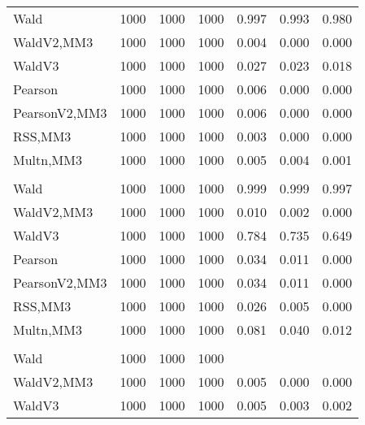 \documentclass[
]{article}
\begin{document}
\begin{table}[H]
{\begin{tabular}[t]{lrrrrrr}
\hspace{1em}Wald & 1000 & 1000 & 1000 & 0.997 & 0.993 & 0.980\\
\hspace{1em}WaldV2,MM3 & 1000 & 1000 & 1000 & 0.004 & 0.000 & 0.000\\
\hspace{1em}WaldV3 & 1000 & 1000 & 1000 & 0.027 & 0.023 & 0.018\\
\hspace{1em}Pearson & 1000 & 1000 & 1000 & 0.006 & 0.000 & 0.000\\
\hspace{1em}PearsonV2,MM3 & 1000 & 1000 & 1000 & 0.006 & 0.000 & 0.000\\
\hspace{1em}RSS,MM3 & 1000 & 1000 & 1000 & 0.003 & 0.000 & 0.000\\
\hspace{1em}Multn,MM3 & 1000 & 1000 & 1000 & 0.005 & 0.004 & 0.001\\
\addlinespace[0.3em]
\multicolumn{7}{l}{\textbf{2F 10V}}\\
\hspace{1em}Wald & 1000 & 1000 & 1000 & 0.999 & 0.999 & 0.997\\
\hspace{1em}WaldV2,MM3 & 1000 & 1000 & 1000 & 0.010 & 0.002 & 0.000\\
\hspace{1em}WaldV3 & 1000 & 1000 & 1000 & 0.784 & 0.735 & 0.649\\
\hspace{1em}Pearson & 1000 & 1000 & 1000 & 0.034 & 0.011 & 0.000\\
\hspace{1em}PearsonV2,MM3 & 1000 & 1000 & 1000 & 0.034 & 0.011 & 0.000\\
\hspace{1em}RSS,MM3 & 1000 & 1000 & 1000 & 0.026 & 0.005 & 0.000\\
\hspace{1em}Multn,MM3 & 1000 & 1000 & 1000 & 0.081 & 0.040 & 0.012\\
\addlinespace[0.3em]
\multicolumn{7}{l}{\textbf{3F 15V}}\\
\hspace{1em}Wald & 1000 & 1000 & 1000 &  &  & \\
\hspace{1em}WaldV2,MM3 & 1000 & 1000 & 1000 & 0.005 & 0.000 & 0.000\\
\hspace{1em}WaldV3 & 1000 & 1000 & 1000 & 0.005 & 0.003 & 0.002\\

\end{tabular}}
\end{table}
\end{document}
